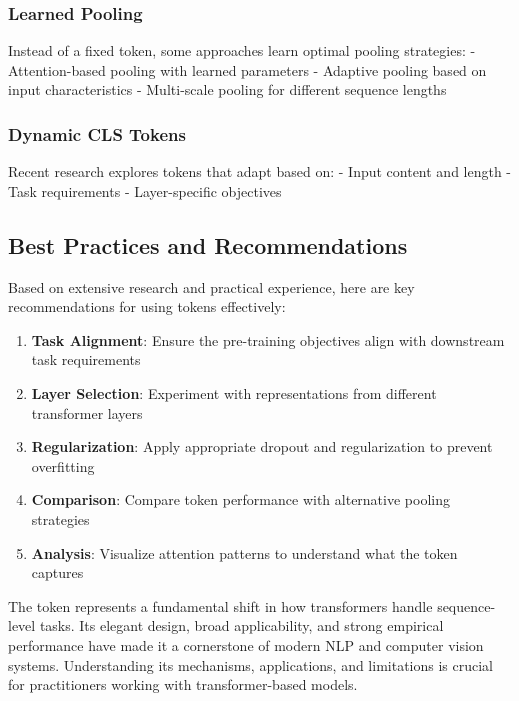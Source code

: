 \subsubsection{Learned Pooling}
Instead of a fixed \cls{} token, some approaches learn optimal pooling strategies:
- Attention-based pooling with learned parameters
- Adaptive pooling based on input characteristics
- Multi-scale pooling for different sequence lengths

\subsubsection{Dynamic CLS Tokens}
Recent research explores \cls{} tokens that adapt based on:
- Input content and length
- Task requirements
- Layer-specific objectives

\subsection{Best Practices and Recommendations}

Based on extensive research and practical experience, here are key recommendations for using \cls{} tokens effectively:

\begin{principle}
\begin{enumerate}
\item \textbf{Task Alignment}: Ensure the pre-training objectives align with downstream task requirements
\item \textbf{Layer Selection}: Experiment with \cls{} representations from different transformer layers
\item \textbf{Regularization}: Apply appropriate dropout and regularization to prevent overfitting
\item \textbf{Comparison}: Compare \cls{} token performance with alternative pooling strategies
\item \textbf{Analysis}: Visualize attention patterns to understand what the \cls{} token captures
\end{enumerate}
\end{principle}

The \cls{} token represents a fundamental shift in how transformers handle sequence-level tasks. Its elegant design, broad applicability, and strong empirical performance have made it a cornerstone of modern NLP and computer vision systems. Understanding its mechanisms, applications, and limitations is crucial for practitioners working with transformer-based models.